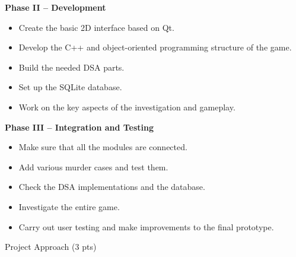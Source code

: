 \documentclass[11pt,a4paper]{article}
\newcommand{\blueheading}[1]{%
    {\sffamily\color{TitleBlue}\fontsize{15}{18}\selectfont #1}%
}
\begin{document}
{\vspace{2mm}

\textbf{Phase II -- Development}

\begin{itemize}[leftmargin=*, itemsep=2pt, topsep=2pt]
    \item Create the basic 2D interface based on Qt.
    \item Develop the C++ and object-oriented programming structure of the game.
    \item Build the needed DSA parts.
    \item Set up the SQLite database.
    \item Work on the key aspects of the investigation and gameplay.
\end{itemize}

\vspace{2mm}

\textbf{Phase III -- Integration and Testing}

\begin{itemize}[leftmargin=*, itemsep=2pt, topsep=2pt]
    \item Make sure that all the modules are connected.
    \item Add various murder cases and test them.
    \item Check the DSA implementations and the database.
    \item Investigate the entire game.
    \item Carry out user testing and make improvements to the final prototype.
\end{itemize}}

\vspace{12mm}
\newpage
\blueheading{Project Approach (3 pts)}

\vspace{1mm}
\end{document}
